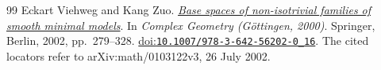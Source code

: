 \begin{thebibliography}{99}
Eckart Viehweg and Kang Zuo.
\emph{\href{https://arxiv.org/abs/math/0103122v3}{Base spaces of non-isotrivial families of smooth minimal models}}.
In \emph{Complex Geometry (G{\"o}ttingen, 2000)}.
Springer, Berlin, 2002, pp.~279--328.
\href{https://doi.org/10.1007/978-3-642-56202-0_16}{doi:\nolinkurl{10.1007/978-3-642-56202-0_16}}.
The cited locators refer to arXiv:math/0103122v3, 26 July 2002.

\end{thebibliography}
